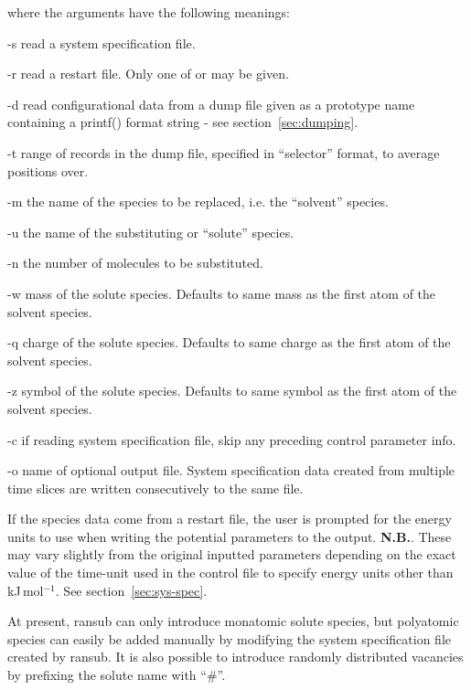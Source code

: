 \documentclass[a4paper,twoside]{report}
\begin{document}
where the arguments have the following meanings:
\begin{Argdescription}
\item[-s] read a system specification file.
\item[-r] read a restart file. Only one of  or  may be given.
\item[-d] read configurational data from a dump file given as a prototype name
  containing a printf() format string - see section~\ref{sec:dumping}. 
\item[-t] range of records in the dump file, specified in ``selector''
  format, to average positions over.
\item[-m] the name of the species to be replaced, i.e. the ``solvent''
  species.
\item[-u] the name of the substituting or ``solute'' species.
\item[-n] the number of molecules to be substituted.
\item[-w] mass of the solute species. Defaults to same mass as the
  first atom of the solvent species.
\item[-q] charge of the solute species. Defaults to same charge as the
  first atom of the solvent species.
\item[-z] symbol of the solute species. Defaults to same symbol as the
  first atom of the solvent species.
\item[-c] if reading system specification file, skip any preceding
  control parameter info.
\item[-o] name of optional output file. System specification data
  created from multiple time slices are written consecutively to the
  same file.
\end{Argdescription}

If the species data come from a restart file, the user is prompted for
the energy units to use when writing the potential parameters to the
output.  \textbf{N.B.}. These may vary slightly from the original
inputted parameters depending on the exact value of the time-unit used
in the control file to specify energy units other than kJ\,mol$^{-1}$. See
section~\ref{sec:sys-spec}.

At present, ransub can only introduce monatomic solute species, but
polyatomic species can easily be added manually by modifying the system
specification file created by ransub. It is also possible to introduce
randomly distributed vacancies by prefixing the solute name with ``\#''.

\end{document}

